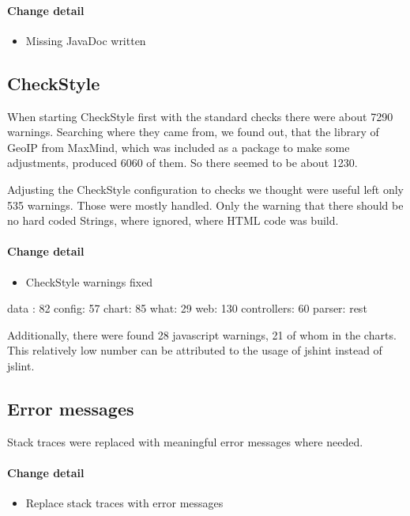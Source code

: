 \paragraph{Change detail}
\begin{itemize}
  \item Missing JavaDoc written
\end{itemize}

\subsection{CheckStyle}\label{cs} %
When starting CheckStyle first with the standard checks there were about 7290 warnings.
Searching where they came from, we found out, that the library of GeoIP from MaxMind, 
which was included as a package to make some adjustments, produced 6060 of them. So there seemed to be about
1230.

Adjusting the CheckStyle configuration to checks we thought were useful left only 535 warnings.
Those were mostly handled. Only the warning that there should be no hard coded Strings, where
ignored, where HTML code was build.

\paragraph{Change detail}
\begin{itemize}
  \item CheckStyle warnings fixed
\end{itemize}
data : 82
config: 57
chart: 85
what: 29
web: 130
controllers: 60 
parser: rest

Additionally, there were found 28 javascript warnings, 21 of whom in the charts.
This relatively low number can be attributed to the usage of jshint instead of jslint.

\subsection{Error messages}
Stack traces were replaced with meaningful error messages where needed.
\paragraph{Change detail}
\begin{itemize}
  \item Replace stack traces with error messages
\end{itemize}

 
